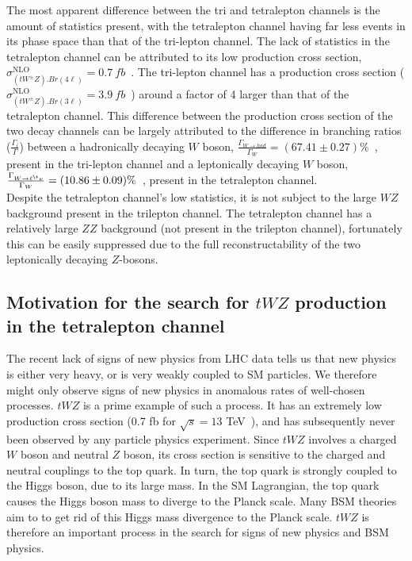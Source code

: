 The most apparent difference between the tri and tetralepton channels is the amount of statistics present, with the tetralepton channel having far less events in its phase space than that of the tri-lepton channel. The lack of statistics in the tetralepton channel can be attributed to its low production cross section, $\sigma^{\text{NLO}}_{(tW^{\pm}Z).Br(4\ell)} = \SI{0.7}{fb}$~\cite{twz-theory-paper}. The tri-lepton channel has a production cross section ($\sigma^{\text{NLO}}_{(tW^{\pm}Z).Br(3\ell)} = \SI{3.9}{fb}$~\cite{twz-theory-paper}) around a factor of 4 larger than that of the tetralepton channel. This difference between the production cross section of the two decay channels can be largely attributed to the difference in branching ratios ($\frac{\Gamma_i}{\Gamma}$) between a hadronically decaying $W$ boson, $\frac{\Gamma_{W \rightarrow had}}{\Gamma_W} = (67.41 \pm 0.27) \%$~\cite{pdg}, present in the tri-lepton channel and a leptonically decaying $W$ boson, $\frac{\Gamma_{W \rightarrow \ell^{\+} \nu}}{\Gamma_W}  = (10.86 \pm 0.09) \%$~\cite{pdg}, present in the tetralepton channel.\\

Despite the tetralepton channel's low statistics, it is not subject to the large $WZ$ background present in the trilepton channel. The tetralepton channel has a relatively large $ZZ$ background (not present in the trilepton channel), fortunately this can be easily suppressed due to the full reconstructability of the two leptonically decaying $Z$-bosons.

\subsection{Motivation for the search for $tWZ$ production in the tetralepton channel}
The recent lack of signs of new physics from LHC data tells us that new physics is either very heavy, or is very weakly coupled to SM particles. We therefore might only observe signs of new physics in anomalous rates of well-chosen processes. $tWZ$ is a prime example of such a process. It has an extremely low production cross section (0.7 fb for $\sqrt{s}= 13$ TeV~\cite{twz-theory-paper}), and has subsequently never been observed by any particle physics experiment. Since $tWZ$ involves a charged $W$ boson and neutral $Z$ boson, its cross section is sensitive to the charged and neutral couplings to the top quark. In turn, the top quark is strongly coupled to the Higgs boson, due to its large mass. In the SM Lagrangian, the top quark causes the Higgs boson mass to diverge to the Planck scale. Many BSM theories aim to to get rid of this Higgs mass divergence to the Planck scale. $tWZ$ is therefore an important process in the search for signs of new physics and BSM physics.\\

